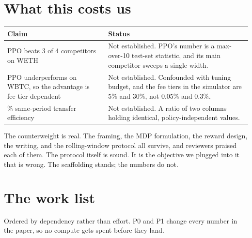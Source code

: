 \documentclass[11pt,a4paper]{article}
\begin{document}
\section{What this costs us}

\begin{center}
\begin{tabular}{p{6.2cm}p{8.6cm}}
\toprule
\textbf{Claim} & \textbf{Status} \\
\midrule
PPO beats 3 of 4 competitors on WETH &
Not established. PPO's number is a max-over-10 test-set statistic, and its main competitor sweeps a
single width. \\
\addlinespace
PPO underperforms on WBTC, so the advantage is fee-tier dependent &
Not established. Confounded with tuning budget, and the fee tiers in the simulator are 5\% and
30\%, not 0.05\% and 0.3\%. \\
\addlinespace
88.5\% same-period transfer efficiency &
Not established. A ratio of two columns holding identical, policy-independent values. \\
\bottomrule
\end{tabular}
\end{center}

\vspace{0.2cm}
\noindent The counterweight is real. The framing, the MDP formulation, the reward design, the
writing, and the rolling-window protocol all survive, and reviewers praised each of them. The
protocol itself is sound. It is the objective we plugged into it that is wrong. The scaffolding
stands; the numbers do not.

\section{The work list}

Ordered by dependency rather than effort. P0 and P1 change every number in the paper, so no compute
gets spent before they land.
\end{document}
